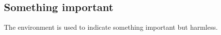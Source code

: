 \documentclass[10pt, a4paper]{article}
\begin{document}

\subsection{Something important}

The  environment is used to indicate something important but harmless.

\end{document}
